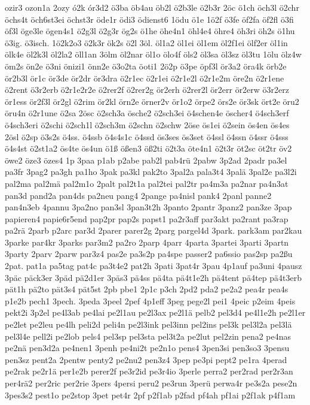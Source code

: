 {ozir3
ozon1a
2ozy
ó2k
ór3d2
ö3ba
öb4au
öb2l
ö2b3le
ö2b3r
2öc
ö1ch
öch3l
ö2chr
öchs4t
öch6st3ei
öchst3r
öde1r
ödi3
ödienst6
1ödu
ö1e
1ö2f
ö3fe
öf2fa
öf2fl
ö3fi
öf3l
öge3le
ögen4s1
ö2g3l
ö2g3r
ög2s
ö1he
öhe4n1
öhl4e4
öhre4
öh3ri
öh2s
ö1hu
ö3ig.
ö3isch.
1ö2k2o3
ö2k3r
ök2s
ö2l
3öl.
öl1a2
öl1ei
öl1em
öl2f1ei
ölf2er
öl1in
ölk4e
öl2k3l
öl2la2
öll1an
3ölm
öl2nar
öl1o
ölo4f
öls2
öl3sa
öl3sz
öl3tu
1ölu
ölz4w
öm2s
ön2e
ö3ni
önizi1
önn2e
ö3o2ta
öoti1
2ö2p
ö3pe
öpf3l
ör3a2
öra4k
örb2e
ör2b3l
ör1c
ör3de
ör2dr
ör3dra
ö2r1ec
ö2r1ei
ö2r1e2l
ö2r1e2m
öre2n
ö2r1ene
ö2rent
ö3r2erb
ö2r1e2r2e
ö2rer2f
ö2rer2g
ör2erh
ö2rer2l
ör2err
ör2erw
ö3r2erz
ör1ess
ör2f3l
ör2gl
ö2rim
ör2kl
örn2e
örner2v
ör1o2
örpe2
örs2e
ör3sk
ört2e
öru2
öru4n
ö2r1une
ö2sa
2ösc
ö2sch3a
ösche2
ö2sch3ei
ö4schen4e
öscher4
ö4sch3erf
ö4sch3eri
ö2schi
ö2sch1l
ö2sch3m
ö2schn
ö2schw
2öse
ös1ei
ö2sein
ös4en
ös4es
2ösl
ö2sp
ö3s2s
ö4ss.
ö4ssb
ö4s4s1c
ö4ssd
ös3ses
ös3set
ö4ssl
ö4ssn
ö4ssr
ö4sss
ö4s4st
ö2st1a2
ös4te
ös4un
ö1ß
ößen3
öß2ti
ö2t3a
öte4n1
ö2t3r
öt2sc
öt2tr
öv2
öwe2
öze3
özes4
1p
3paa
p1ab
p2abe
pab2l
pab4rü
2pabw
3p2ad
2padr
pa3el
pa3fr
3pag2
pa3gh
pa1ho
3pak
pa3kl
pak2to
3pal2a
pala3t4
3palä
3pal2e
pa3l2i
pal2ma
pal2mä
pal2m1o
2palt
pal2t1a
pal2tei
pal2tr
pa4m3a
pa2nar
pa4n3at
pan3d
pand2a
pan4ds
pa2neu
pang4
2pange
pa4nisl
pank4
2panl
panne2
pan4n3eb
4pannu
3pa2no
pan3sl
3pan3t2h
3panto
2pantr
3panz2
pan3ze
3pap
papieren4
papie6r5end
pap2pr
pap2s
papst1
pa2r3aff
par3akt
pa2rant
pa3rap
pa2rä
2parb
p2arc
par3d
2parer
parer2g
2parg
pargel4d
3park.
park3am
par2kau
3parke
par4kr
3parks
par3m2
pa2ro
2parp
4parr
4parta
3partei
3parti
3partn
3party
2parv
2parw
par3z4
pas2e
pa3s2p
pa4spe
passer2
pa6ssio
pas2sp
pa2ßu
2pat.
pat1a
pa5tag
pat4c
pa3t4e2
pat2h
3pati
3pat4r
3pau
4p1auf
pa3uni
4pausz
3päc
päck3er
3päd
pä2d1er
3päs3
pä4ss
pä4ta
pä4t1e2h
pä4tent
pä4tep
pä4t3erb
pät1h
pä2to
pät3s4
pät5st
2pb
pbe1
2p1c
p3ch
2pd2
pda2
pe2a2
pea4r
pea4s
p1e2b
pech1
3pech.
3peda
3peel
2pef
4p1eff
3peg
pege2l
pei1
4peic
p2eim
4peis
pekt2i
3p2el
pe4l3ab
pe4lai
pe2l1au
pe2l3ax
pe2l1ä
pelb2
pel3d4
pe4l1e2h
pe2l1er
pe2let
pe2leu
pe4lh
peli2d
peli4n
pe2l3ink
pel3inn
pel2ins
pel3k
pel3l2a
pel3lä
pel3l4e
pell2i
pe2lob
pels4
pel3sp
pel3sta
pel3t2a
pe2lut
pel2zin
pena2
pe4nas
pe2nä
pen3d2a
pe4nen1
3penh
pe4ni2t
pe2n1o
pens4
3pen3si
pen3so3
3pensu
pen3sz
pent2a
2pentw
penty2
pe2nu2
pen3z4
3pep
pe3pi
pept2
pe1ra
4perad
pe2rak
pe2r1ä
per1e2b
perer2f
pe3r2id
pe3r4io
3perle
perra2
per2rad
per2r3an
per4rä2
per2ric
per2rie
3pers
4persi
peru2
pe3run
3perü
perwa4r
pe3s2a
pese2n
3pes3s2
pest1o
pe2stop
3pet
pet4r
2pf
p2f1ab
p2fad
pf4ah
pf1ai
p2f1ak
p4f1am
}
